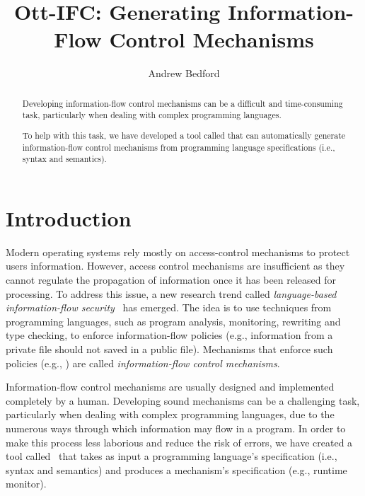 \documentclass[sigplan,10pt,screen]{acmart}
\begin{document}
\title[ott-ifc]{Ott-IFC: Generating Information-Flow Control Mechanisms}


\author{Andrew Bedford}


\begin{abstract}
Developing information-flow control mechanisms can be a difficult and time-consuming task, particularly when dealing with complex programming languages. 

To help with this task, we have developed a tool called \emph{\ottifc} that can automatically generate information-flow control mechanisms from programming language specifications (i.e., syntax and semantics).
\end{abstract}

\maketitle

\section{Introduction}
Modern operating systems rely mostly on access-control mechanisms to protect users information. However, access control mechanisms are insufficient as they cannot regulate the propagation of information once it has been released for processing. To address this issue, a new research trend called \emph{language-based information-flow security}~\cite{DBLP:journals/jsac/SabelfeldM03} has emerged. The idea is to use techniques from programming languages, such as program analysis, monitoring, rewriting and type checking, to enforce information-flow policies (e.g., information from a private file should not saved in a public file). Mechanisms that enforce such policies (e.g., \cite{DBLP:journals/jcs/VolpanoIS96, DBLP:conf/csfw/ChudnovN10,DBLP:journals/compsec/BedfordCDKT17}) are called \emph{information-flow control mechanisms}. 

Information-flow control mechanisms are usually designed and implemented completely by a human. Developing sound mechanisms can be a challenging task, particularly when dealing with complex programming languages, due to the numerous ways through which information may flow in a program. In order to make this process less laborious and reduce the risk of errors, we have created a tool called \ottifc\ that takes as input a programming language's specification (i.e., syntax and semantics) and produces a mechanism's specification (e.g., runtime monitor).
\end{document}
